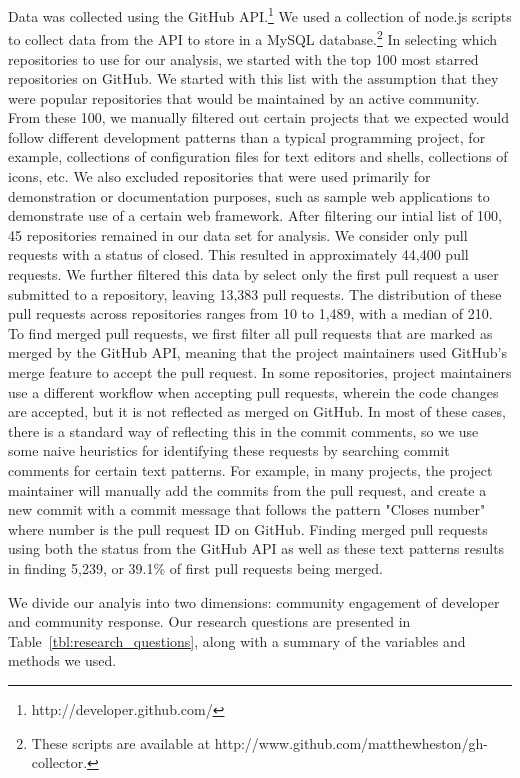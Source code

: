 \documentclass{iitthesis}
\begin{document}
Data was collected using the GitHub API.\footnote{http://developer.github.com/}
We used a collection of node.js scripts to collect data from the API to store in
a MySQL database.\footnote{These scripts are available at
http://www.github.com/matthewheston/gh-collector.} In selecting which
repositories to use for our analysis, we started with the top 100 most starred
repositories on GitHub. We started with this list with the assumption that they
were popular repositories that would be maintained by an active community. From
these 100, we manually filtered out certain projects that we expected would
follow different development patterns than a typical programming project, for
example, collections of configuration files for text editors and shells,
collections of icons, etc. We also excluded repositories that were used
primarily for demonstration or documentation purposes, such as sample web
applications to demonstrate use of a certain web framework. After filtering our
intial list of 100, 45 repositories remained in our data set for analysis. We
consider only pull requests with a status of closed. This resulted in
approximately 44,400 pull requests. We further filtered this data by select only
the first pull request a user submitted to a repository, leaving 13,383 pull
requests. The distribution of these pull requests across repositories ranges
from 10 to 1,489, with a median of 210. To find merged pull requests, we first
filter all pull requests that are marked as merged by the GitHub API, meaning
that the project maintainers used GitHub's merge feature to accept the pull
request. In some repositories, project maintainers use a different workflow when
accepting pull requests, wherein the code changes are accepted, but it is not
reflected as merged on GitHub. In most of these cases, there is a standard way
of reflecting this in the commit comments, so we use some naive heuristics for
identifying these requests by searching commit comments for certain text
patterns. For example, in many projects, the project maintainer will manually
add the commits from the pull request, and create a new commit with a commit
message that follows the pattern "Closes {number}" where {number} is the pull
request ID on GitHub. Finding merged pull requests using both the status from
the GitHub API as well as these text patterns results in finding 5,239, or
39.1\% of first pull requests being merged.

 \label{sec:data_analysis}

We divide our analyis into two dimensions: community engagement of developer and
community response. Our research questions are presented in
Table~\ref{tbl:research_questions}, along with a summary of the variables and
methods we used.
\end{document}
